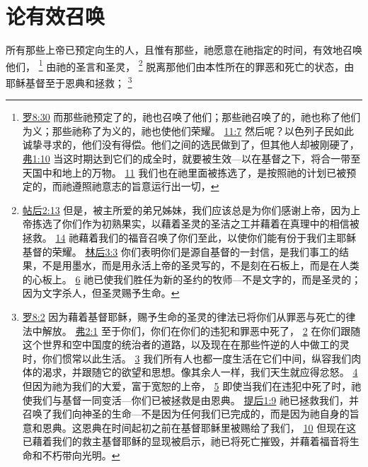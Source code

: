\documentclass[12pt, a4paper, oneside]{ctexart}
\newcounter{parnum}[section]
\newcommand{\N}{%
   \noindent\refstepcounter{parnum}%
    \makebox[\parindent][l]{\textbf{\arabic{parnum}.}}}
\begin{document}
\section{论有效召唤}

\N 所有那些上帝已预定向生的人，且惟有那些，祂愿意在祂指定的时间，有效地召唤他们，
	\footnote {
		\href{https://biblehub.com/romans/8-30.htm}{罗8:30} 而那些祂预定了的，祂也召唤了他们；那些祂召唤了的，祂也称了他们为义；那些祂称了为义的，祂也使他们荣耀。
		\href{https://biblehub.com/romans/11-7.htm}{11:7} 然后呢？以色列子民如此诚挚寻求的，他们没有得偿。他们之间的选民做到了，但其他人却被刚硬了，
		\href{https://biblehub.com/ephesians/1-10.htm}{弗1:10} 当这时期达到它们的成全时，就要被生效---以在基督之下，将合一带至天国中和地上的万物。
		\href{https://biblehub.com/ephesians/1-11.htm}{11} 我们也在祂里面被拣选了，是按照祂的计划已被预定的，而祂遵照祂意志的旨意运行出一切，
	}
	由祂的圣言和圣灵，
	\footnote {
		\href{https://biblehub.com/2_thessalonians/2-13.htm}{帖后2:13} 但是，被主所爱的弟兄姊妹，我们应该总是为你们感谢上帝，因为上帝拣选了你们作为初熟果实，以藉着圣灵的圣洁之工并藉着在真理中的相信被拯救。
		\href{https://biblehub.com/2_thessalonians/2-14.htm}{14} 祂藉着我们的福音召唤了你们至此，以使你们能有份于我们主耶稣基督的荣耀。
		\href{https://biblehub.com/2_corinthians/3-3.htm}{林后3:3} 你们表明你们是源自基督的一封信，是我们事工的结果，不是用墨水，而是用永活上帝的圣灵写的，不是刻在石板上，而是在人类的心板上。
		\href{https://biblehub.com/2_corinthians/3-6.htm}{6} 祂已使我们胜任为新的圣约的牧师---不是文字的，而是圣灵的；因为文字杀人，但圣灵赐予生命。
	}
	脱离那他们由本性所在的罪恶和死亡的状态，由耶稣基督至于恩典和拯救；
	\footnote {
		\href{https://biblehub.com/romans/8-2.htm}{罗8:2} 因为藉着基督耶稣，赐予生命的圣灵的律法已将你们从罪恶与死亡的律法中解放。
		\href{https://biblehub.com/ephesians/2-1.htm}{弗2:1} 至于你们，你们在你们的违犯和罪恶中死了，
		\href{https://biblehub.com/ephesians/2-2.htm}{2} 在你们跟随这个世界和空中国度的统治者的道路，以及现在在那些忤逆的人中做工的灵时，你们惯常以此生活。
		\href{https://biblehub.com/ephesians/2-3.htm}{3} 我们所有人也都一度生活在它们中间，纵容我们肉体的渴求，并跟随它的欲望和思想。像其余人一样，我们天生就应得忿怒。
		\href{https://biblehub.com/ephesians/2-4.htm}{4} 但因为祂为我们的大爱，富于宽恕的上帝，
		\href{https://biblehub.com/ephesians/2-5.htm}{5} 即使当我们在违犯中死了时，祂使我们与基督一同变活---你们已被拯救是由恩典。
		\href{https://biblehub.com/2_timothy/1-9.htm}{提后1:9} 祂已拯救我们，并召唤了我们向神圣的生命---不是因为任何我们已完成的，而是因为祂自身的旨意和恩典。这恩典在时间起初之前在基督耶稣里被赐给了我们，
		\href{https://biblehub.com/2_timothy/1-10.htm}{10} 但现在这已藉着我们的救主基督耶稣的显现被启示，祂已将死亡摧毁，并藉着福音将生命和不朽带向光明。
	}
\end{document}
